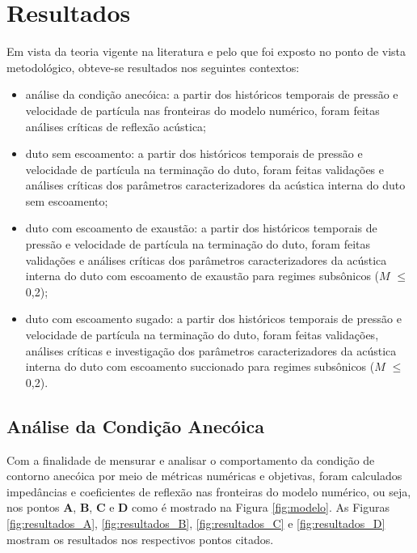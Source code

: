 \chapter{Resultados}

Em vista da teoria vigente na literatura e pelo que foi exposto no ponto de vista metodológico, obteve-se resultados nos seguintes contextos:
\begin{itemize}
  \item análise da condição anecóica: a partir dos históricos temporais de pressão e velocidade de partícula nas fronteiras do modelo numérico, foram feitas análises críticas de reflexão acústica;
  \item duto sem escoamento: a partir dos históricos temporais de pressão e velocidade de partícula na terminação do duto, foram feitas validações e análises críticas dos parâmetros caracterizadores da acústica interna do duto sem escoamento;
  \item duto com escoamento de exaustão: a partir dos históricos temporais de pressão e velocidade de partícula na terminação do duto, foram feitas validações e análises críticas dos parâmetros caracterizadores da acústica interna do duto com escoamento de exaustão para regimes subsônicos ($M$ $\leq$ 0,2);
  \item duto com escoamento sugado: a partir dos históricos temporais de pressão e velocidade de partícula na terminação do duto, foram feitas validações, análises críticas e investigação dos parâmetros caracterizadores da acústica interna do duto com escoamento succionado para regimes subsônicos ($M$ $\leq$ 0,2).
\end{itemize} 

\section{Análise da Condição Anecóica}

Com a finalidade de mensurar e analisar o comportamento da condição de contorno anecóica por meio de métricas numéricas e objetivas, foram calculados impedâncias e coeficientes de reflexão nas fronteiras do modelo numérico, ou seja, nos pontos \textbf{A}, \textbf{B}, \textbf{C} e \textbf{D} como é mostrado na Figura \ref{fig:modelo}. As Figuras \ref{fig:resultados_A}, \ref{fig:resultados_B}, \ref{fig:resultados_C} e \ref{fig:resultados_D} mostram os resultados nos respectivos pontos citados.


